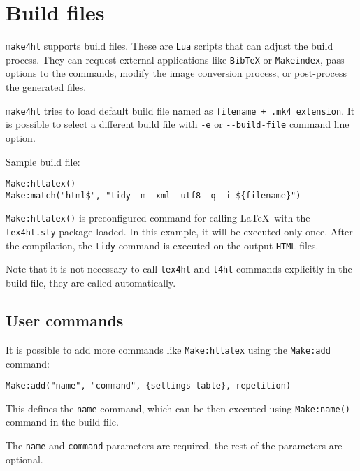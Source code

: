 \hypertarget{build-files}{%
\section{Build files}\label{build-files}}

\label{sec:buildfiles}

\texttt{make4ht} supports build files. These are \texttt{Lua} scripts
that can adjust the build process. They can request external
applications like \texttt{BibTeX} or \texttt{Makeindex}, pass options to
the commands, modify the image conversion process, or post-process the
generated files.

\texttt{make4ht} tries to load default build file named as
\texttt{filename\ +\ .mk4\ extension}. It is possible to select a
different build file with \texttt{-e} or \texttt{-\/-build-file} command
line option.

Sample build file:

\begin{verbatim}
Make:htlatex()
Make:match("html$", "tidy -m -xml -utf8 -q -i ${filename}")
\end{verbatim}

\texttt{Make:htlatex()} is preconfigured command for calling \LaTeX~with
the \texttt{tex4ht.sty} package loaded. In this example, it will be
executed only once. After the compilation, the \texttt{tidy} command is
executed on the output \texttt{HTML} files.

Note that it is not necessary to call \texttt{tex4ht} and \texttt{t4ht}
commands explicitly in the build file, they are called automatically.

\hypertarget{user-commands}{%
\subsection{User commands}\label{user-commands}}

It is possible to add more commands like \texttt{Make:htlatex} using the
\texttt{Make:add} command:

\begin{verbatim}
Make:add("name", "command", {settings table}, repetition)
\end{verbatim}

This defines the \texttt{name} command, which can be then executed using
\texttt{Make:name()} command in the build file.

The \texttt{name} and \texttt{command} parameters are required, the rest
of the parameters are optional.

